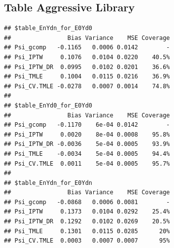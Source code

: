 \documentclass[11pt]{article}\usepackage[]{graphicx}\usepackage[]{color}
\makeatletter
\newenvironment{kframe}{%
 \def\at@end@of@kframe{}%
 \ifinner\ifhmode%
  \def\at@end@of@kframe{\end{minipage}}%
  \begin{minipage}{\columnwidth}%
 \fi\fi%
 \def\FrameCommand##1{\hskip\@totalleftmargin \hskip-\fboxsep
 \colorbox{shadecolor}{##1}\hskip-\fboxsep
     \hskip-\linewidth \hskip-\@totalleftmargin \hskip\columnwidth}%
 \MakeFramed {\advance\hsize-\width
   \@totalleftmargin\z@ \linewidth\hsize
   \@setminipage}}%
 {\par\unskip\endMakeFramed%
 \at@end@of@kframe}
\newenvironment{knitrout}{}{} %
\makeatother
\begin{document}
\subsection{Table Aggressive Library}
\begin{knitrout}
\color{fgcolor}\begin{kframe}
\begin{verbatim}
## $table_EnYdn_for_E0Yd0
##                Bias Variance    MSE Coverage
## Psi_gcomp   -0.1165   0.0006 0.0142        -
## Psi_IPTW     0.1076   0.0104 0.0220    40.5%
## Psi_IPTW_DR  0.0995   0.0102 0.0201    36.6%
## Psi_TMLE     0.1004   0.0115 0.0216    36.9%
## Psi_CV.TMLE -0.0278   0.0007 0.0014    74.8%
## 
## $table_EnYd0_for_E0Yd0
##                Bias Variance    MSE Coverage
## Psi_gcomp   -0.1170    6e-04 0.0142        -
## Psi_IPTW     0.0020    8e-04 0.0008    95.8%
## Psi_IPTW_DR -0.0036    5e-04 0.0005    93.9%
## Psi_TMLE    -0.0034    5e-04 0.0005    94.4%
## Psi_CV.TMLE  0.0011    5e-04 0.0005    95.7%
## 
## $table_EnYdn_for_E0Ydn
##                Bias Variance    MSE Coverage
## Psi_gcomp   -0.0868   0.0006 0.0081        -
## Psi_IPTW     0.1373   0.0104 0.0292    25.4%
## Psi_IPTW_DR  0.1292   0.0102 0.0269    20.5%
## Psi_TMLE     0.1301   0.0115 0.0285      20%
## Psi_CV.TMLE  0.0003   0.0007 0.0007      95%
\end{verbatim}
\end{kframe}
\end{knitrout}
\end{document}
